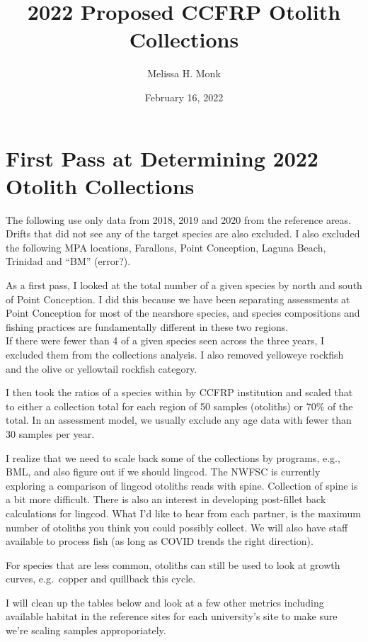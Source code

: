 \documentclass[
]{article}
\title{2022 Proposed CCFRP Otolith Collections}
\author{Melissa H. Monk}
\date{February 16, 2022}
\begin{document}
\maketitle

\hypertarget{first-pass-at-determining-2022-otolith-collections}{%
\section{First Pass at Determining 2022 Otolith Collections}\label{first-pass-at-determining-2022-otolith-collections}}

The following use only data from 2018, 2019 and 2020 from the reference areas. Drifts that did not see any of the target species are also excluded. I also excluded the following MPA locations, Farallons, Point Conception, Laguna Beach, Trinidad and ``BM'' (error?).

As a first pass, I looked at the total number of a given species by north and south
of Point Conception. I did this because we have been separating assessments at
Point Conception for most of the nearshore species, and species compositions and
fishing practices are fundamentally different in these two regions.\\
If there were fewer than 4 of a given species seen across the three years, I
excluded them from the collections analysis. I also removed yelloweye rockfish
and the olive or yellowtail rockfish category.

I then took the ratios of a
species within by CCFRP institution and scaled that to either a collection total
for each region of 50 samples (otoliths) or 70\% of the total. In an assessment model,
we usually exclude any age data with fewer than 30 samples per year.

I realize that we need to scale back some of the collections by programs, e.g., BML,
and also figure out if we should lingcod. The NWFSC is currently exploring
a comparison of lingcod otoliths reads with spine. Collection of spine is a bit more
difficult. There is also an interest in developing post-fillet back calculations
for lingcod. What I'd like to hear from each partner, is the maximum number of
otoliths you think you could possibly collect. We will also have staff available
to process fish (as long as COVID trends the right direction).

For species that are less common, otoliths can still be used to look at growth
curves, e.g.~copper and quillback this cycle.

I will clean up the tables below and look at a few other metrics including
available habitat in the reference sites for each university's site to make sure
we're scaling samples approporiately.
\end{document}
